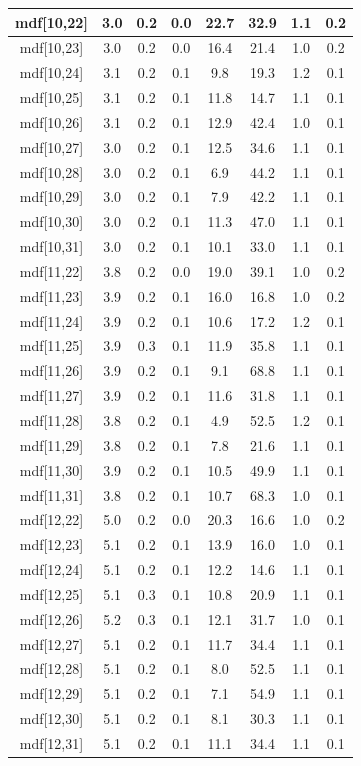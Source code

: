 \begin{longtable}{|c|c|c|c|c|c|c|c|}
\hline
mdf[10,22] & 3.0 & 0.2 & 0.0 & 22.7 & 32.9 & 1.1 & 0.2 \\
\hline
mdf[10,23] & 3.0 & 0.2 & 0.0 & 16.4 & 21.4 & 1.0 & 0.2 \\
\hline
mdf[10,24] & 3.1 & 0.2 & 0.1 & 9.8 & 19.3 & 1.2 & 0.1 \\
\hline
mdf[10,25] & 3.1 & 0.2 & 0.1 & 11.8 & 14.7 & 1.1 & 0.1 \\
\hline
mdf[10,26] & 3.1 & 0.2 & 0.1 & 12.9 & 42.4 & 1.0 & 0.1 \\
\hline
mdf[10,27] & 3.0 & 0.2 & 0.1 & 12.5 & 34.6 & 1.1 & 0.1 \\
\hline
mdf[10,28] & 3.0 & 0.2 & 0.1 & 6.9 & 44.2 & 1.1 & 0.1 \\
\hline
mdf[10,29] & 3.0 & 0.2 & 0.1 & 7.9 & 42.2 & 1.1 & 0.1 \\
\hline
mdf[10,30] & 3.0 & 0.2 & 0.1 & 11.3 & 47.0 & 1.1 & 0.1 \\
\hline
mdf[10,31] & 3.0 & 0.2 & 0.1 & 10.1 & 33.0 & 1.1 & 0.1 \\
\hline
mdf[11,22] & 3.8 & 0.2 & 0.0 & 19.0 & 39.1 & 1.0 & 0.2 \\
\hline
mdf[11,23] & 3.9 & 0.2 & 0.1 & 16.0 & 16.8 & 1.0 & 0.2 \\
\hline
mdf[11,24] & 3.9 & 0.2 & 0.1 & 10.6 & 17.2 & 1.2 & 0.1 \\
\hline
mdf[11,25] & 3.9 & 0.3 & 0.1 & 11.9 & 35.8 & 1.1 & 0.1 \\
\hline
mdf[11,26] & 3.9 & 0.2 & 0.1 & 9.1 & 68.8 & 1.1 & 0.1 \\
\hline
mdf[11,27] & 3.9 & 0.2 & 0.1 & 11.6 & 31.8 & 1.1 & 0.1 \\
\hline
mdf[11,28] & 3.8 & 0.2 & 0.1 & 4.9 & 52.5 & 1.2 & 0.1 \\
\hline
mdf[11,29] & 3.8 & 0.2 & 0.1 & 7.8 & 21.6 & 1.1 & 0.1 \\
\hline
mdf[11,30] & 3.9 & 0.2 & 0.1 & 10.5 & 49.9 & 1.1 & 0.1 \\
\hline
mdf[11,31] & 3.8 & 0.2 & 0.1 & 10.7 & 68.3 & 1.0 & 0.1 \\
\hline
mdf[12,22] & 5.0 & 0.2 & 0.0 & 20.3 & 16.6 & 1.0 & 0.2 \\
\hline
mdf[12,23] & 5.1 & 0.2 & 0.1 & 13.9 & 16.0 & 1.0 & 0.1 \\
\hline
mdf[12,24] & 5.1 & 0.2 & 0.1 & 12.2 & 14.6 & 1.1 & 0.1 \\
\hline
mdf[12,25] & 5.1 & 0.3 & 0.1 & 10.8 & 20.9 & 1.1 & 0.1 \\
\hline
mdf[12,26] & 5.2 & 0.3 & 0.1 & 12.1 & 31.7 & 1.0 & 0.1 \\
\hline
mdf[12,27] & 5.1 & 0.2 & 0.1 & 11.7 & 34.4 & 1.1 & 0.1 \\
\hline
mdf[12,28] & 5.1 & 0.2 & 0.1 & 8.0 & 52.5 & 1.1 & 0.1 \\
\hline
mdf[12,29] & 5.1 & 0.2 & 0.1 & 7.1 & 54.9 & 1.1 & 0.1 \\
\hline
mdf[12,30] & 5.1 & 0.2 & 0.1 & 8.1 & 30.3 & 1.1 & 0.1 \\
\hline
mdf[12,31] & 5.1 & 0.2 & 0.1 & 11.1 & 34.4 & 1.1 & 0.1 \\
\hline
\end{longtable}
